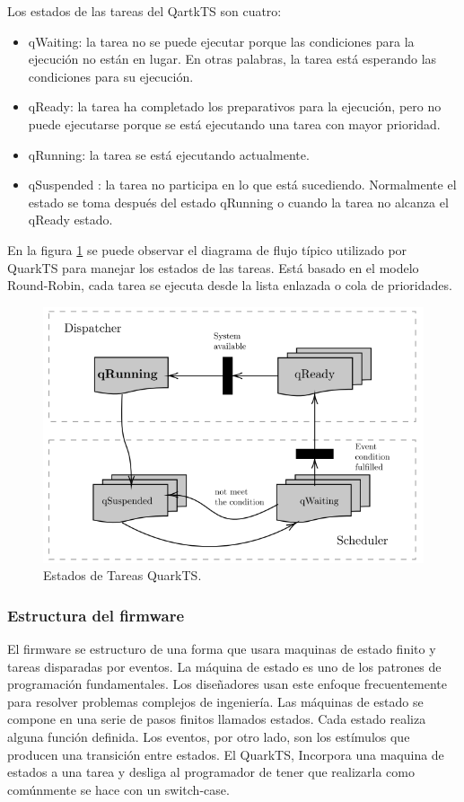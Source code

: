 Los estados de las tareas del QartkTS son cuatro: 
\begin{itemize}
    \item qWaiting: la tarea no se puede ejecutar porque las condiciones para la ejecución no están en lugar. En otras palabras, la tarea está esperando las condiciones para su ejecución.
    \item qReady: la tarea ha completado los preparativos para la ejecución, pero no puede ejecutarse porque se está ejecutando una tarea con mayor prioridad.
    \item qRunning: la tarea se está ejecutando actualmente.
    \item qSuspended : la tarea no participa en lo que está sucediendo. Normalmente el estado se toma después del estado qRunning o cuando la tarea no alcanza el qReady estado.
\end{itemize}
En la figura \ref{fig:TaskStateQartkTs} se puede observar el diagrama de flujo típico utilizado por QuarkTS para manejar los estados de las tareas. Está basado en el modelo Round-Robin, cada tarea se ejecuta desde la lista enlazada o cola de prioridades.
\begin{figure}[H]
	\centering
	\includegraphics[scale=.65]{./Figures/TaskStateQartkTs.PNG}
	\caption{Estados de Tareas QuarkTS.\protect\footnotemark}
	\label{fig:TaskStateQartkTs}
\end{figure}
 \subsubsection{Estructura del firmware}
 El firmware se estructuro de una forma que usara maquinas de estado finito y tareas disparadas por eventos. La máquina de estado es uno de los patrones de programación fundamentales. Los diseñadores usan este enfoque frecuentemente para resolver problemas complejos de ingeniería. Las máquinas de estado se compone en una serie de pasos finitos llamados estados. Cada estado realiza alguna función definida. Los eventos, por otro lado, son los estímulos que producen una transición entre estados.
El QuarkTS, Incorpora una maquina de estados a una tarea y desliga al programador de tener que realizarla como comúnmente se hace con un switch-case.

